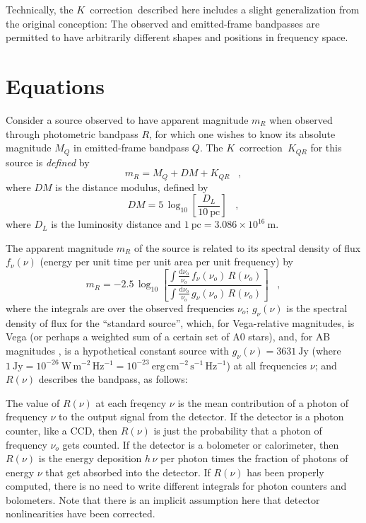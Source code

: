 \documentclass[preprint]{aastex}
\newcommand{\kcorrection}{$K$~correction}
\newcommand{\nuobs}{\nu_o}
\begin{document}
Technically, the \kcorrection\ described here includes a slight
generalization from the original conception: The observed and
emitted-frame bandpasses are permitted to have arbitrarily different
shapes and positions in frequency space.

\section{Equations}

Consider a source observed to have apparent magnitude $m_R$ when
observed through photometric bandpass $R$, for which one wishes to
know its absolute magnitude $M_Q$ in emitted-frame bandpass $Q$.  The
\kcorrection\ $K_{QR}$ for this source is \emph{defined} by
\begin{equation}
\label{eq:definition}
m_R = M_Q + DM + K_{QR} \;\;\;,
\end{equation}
where $DM$ is the distance modulus, defined by
\begin{equation}
DM = 5\,\log_{10}\left[\frac{D_L}{10~\mathrm{pc}}\right] \;\;\;,
\end{equation}
where $D_L$ is the luminosity distance \citep[eg,][]{hogg99cosm} and
$1~\mathrm{pc}= 3.086\times 10^{16}~\mathrm{m}$.

The apparent magnitude $m_R$ of the source is related to its spectral
density of flux $f_{\nu}(\nu)$ (energy per unit time per unit area per
unit frequency) by
\begin{equation}
m_R = -2.5\,\log_{10}\left[
  \frac{\displaystyle
          \int\frac{\mathrm{d}\nuobs}{\nuobs}\,f_{\nu}(\nuobs)\,R(\nuobs)}
       {\displaystyle
          \int\frac{\mathrm{d}\nuobs}{\nuobs}\,g_{\nu}(\nuobs)\,R(\nuobs)}
\right] \;\;\;,
\end{equation}
where the integrals are over the observed frequencies $\nuobs$;
$g_{\nu}(\nu)$ is the spectral density of flux for the ``standard
source'', which, for Vega-relative magnitudes, is Vega (or perhaps a
weighted sum of a certain set of A0 stars), and, for AB magnitudes
\citep{oke83a}, is a hypothetical constant source with
$g_{\nu}(\nu)=3631~\mathrm{Jy}$ (where $1~\mathrm{Jy}=
10^{-26}~\mathrm{W\,m^{-2}\,Hz^{-1}}=
10^{-23}~\mathrm{erg\,cm^{-2}\,s^{-1}\,Hz^{-1}}$) at all frequencies
$\nu$; and $R(\nu)$ describes the bandpass, as follows:

The value of $R(\nu)$ at each freqency $\nu$ is the mean contribution
of a photon of frequency $\nu$ to the output signal from the detector.
If the detector is a photon counter, like a CCD, then $R(\nu)$ is just
the probability that a photon of frequency $\nuobs$ gets counted.  If
the detector is a bolometer or calorimeter, then $R(\nu)$ is the
energy deposition $h\,\nu$ per photon times the fraction of photons of
energy $\nu$ that get absorbed into the detector.  If $R(\nu)$ has
been properly computed, there is no need to write different integrals
for photon counters and bolometers.  Note that there is an implicit
assumption here that detector nonlinearities have been corrected.
\end{document}
